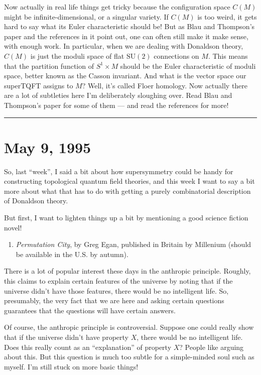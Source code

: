 \documentclass{article}
\def\tightlist{}
\begin{document}
Now actually in real life things get tricky because the configuration
space \(C(M)\) might be infinite-dimensional, or a singular variety. If
\(C(M)\) is too weird, it gets hard to say what its Euler characteristic
should be! But as Blau and Thompson's paper and the references in it
point out, one can often still make it make sense, with enough work. In
particular, when we are dealing with Donaldson theory, \(C(M)\) is just
the moduli space of flat \(\mathrm{SU}(2)\) connections on \(M\). This
means that the partition function of \(S^1\times M\) should be the Euler
characteristic of moduli space, better known as the Casson invariant.
And what is the vector space our superTQFT assigns to \(M\)? Well, it's
called Floer homology. Now actually there are a lot of subtleties here
I'm deliberately sloughing over. Read Blau and Thompson's paper for some
of them --- and read the references for more!

\begin{center}\rule{0.5\linewidth}{0.5pt}\end{center}
\hypertarget{week52}{%
\section{May 9, 1995}\label{week52}}

So, last ``week'', I said a bit about how supersymmetry could be handy
for constructing topological quantum field theories, and this week I
want to say a bit more about what that has to do with getting a purely
combinatorial description of Donaldson theory.

But first, I want to lighten things up a bit by mentioning a good
science fiction novel!

\begin{enumerate}
\def\labelenumi{\arabic{enumi})}
\tightlist
\item
  \emph{Permutation City}, by Greg Egan, published in Britain by
  Millenium (should be available in the U.S. by autumn).
\end{enumerate}

There is a lot of popular interest these days in the anthropic
principle. Roughly, this claims to explain certain features of the
universe by noting that if the universe didn't have those features,
there would be no intelligent life. So, presumably, the very fact that
we are here and asking certain questions guarantees that the questions
will have certain answers.

Of course, the anthropic principle is controversial. Suppose one could
really show that if the universe didn't have property \(X\), there would
be no intelligent life. Does this really count as an ``explanation'' of
property \(X\)? People like arguing about this. But this question is
much too subtle for a simple-minded soul such as myself. I'm still stuck
on more basic things!
\end{document}
